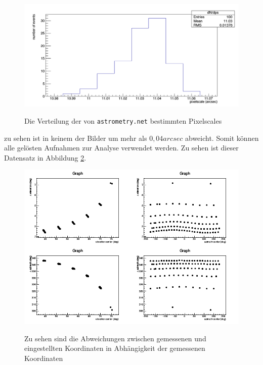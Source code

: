\begin{figure}[htbp]
\centering
\includegraphics[width=\textwidth]{../341/histo.png}
\label{img:ps}
\caption{Die Verteilung der von \texttt{astrometry.net} bestimmten Pixelscales}
\end{figure}
zu sehen ist in keinem der Bilder um mehr als $0,04\unit{arcsec}$ abweicht. Somit können alle gelösten Aufnahmen zur Analyse verwendet werden. Zu sehen ist dieser Datensatz in Abbildung \ref{img:dataset}.
\begin{figure}[htbp]
\centering
\includegraphics[width=\textwidth]{../341/data2.png}
\label{img:dataset}
\caption{Zu sehen sind die Abweichungen zwischen gemessenen und eingestellten Koordinaten in Abhängigkeit der gemessenen Koordinaten}
\end{figure}
